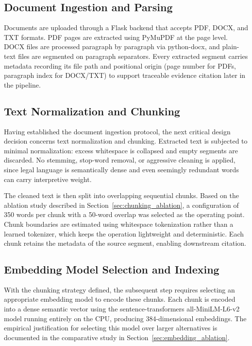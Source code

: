 \documentclass[conference]{IEEEtran}
\begin{document}
\subsection{Document Ingestion and Parsing}

Documents are uploaded through a Flask backend that accepts PDF, DOCX, and TXT formats. PDF pages are extracted using PyMuPDF at the page level. DOCX files are processed paragraph by paragraph via python-docx, and plain-text files are segmented on paragraph separators. Every extracted segment carries metadata recording its file path and positional origin (page number for PDFs, paragraph index for DOCX/TXT) to support traceable evidence citation later in the pipeline.

\subsection{Text Normalization and Chunking}

Having established the document ingestion protocol, the next critical design decision concerns text normalization and chunking. Extracted text is subjected to minimal normalization: excess whitespace is collapsed and empty segments are discarded. No stemming, stop-word removal, or aggressive cleaning is applied, since legal language is semantically dense and even seemingly redundant words can carry interpretive weight.

The cleaned text is then split into overlapping sequential chunks. Based on the ablation study described in Section~\ref{sec:chunking_ablation}, a configuration of 350 words per chunk with a 50-word overlap was selected as the operating point. Chunk boundaries are estimated using whitespace tokenization rather than a learned tokenizer, which keeps the operation lightweight and deterministic. Each chunk retains the metadata of the source segment, enabling downstream citation.

\subsection{Embedding Model Selection and Indexing}

With the chunking strategy defined, the subsequent step requires selecting an appropriate embedding model to encode these chunks. Each chunk is encoded into a dense semantic vector using the sentence-transformers all-MiniLM-L6-v2 model running entirely on the CPU, producing 384-dimensional embeddings. The empirical justification for selecting this model over larger alternatives is documented in the comparative study in Section~\ref{sec:embedding_ablation}.
\end{document}
